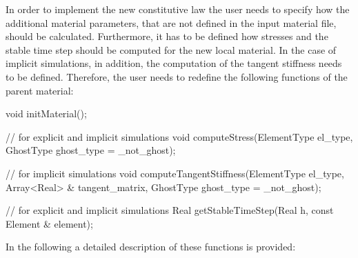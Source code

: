 In order to implement the new constitutive law the user needs to
specify how the additional material parameters, that are not
defined in the input material file, should be calculated. Furthermore,
it has to be defined how stresses and the stable time step should be
computed for the new local material. In the case of implicit
simulations, in addition, the computation of the tangent stiffness needs
to be defined. Therefore, the user needs to redefine the following
functions of the parent material:
\begin{cpp}
void initMaterial();

// for explicit and implicit simulations void
computeStress(ElementType el_type, GhostType ghost_type = _not_ghost);

// for implicit simulations
void computeTangentStiffness(ElementType el_type,
			     Array<Real> & tangent_matrix,
			     GhostType ghost_type = _not_ghost);

// for explicit and implicit simulations
Real getStableTimeStep(Real h, const Element & element);
\end{cpp}
In the following a detailed description of these functions is provided:
